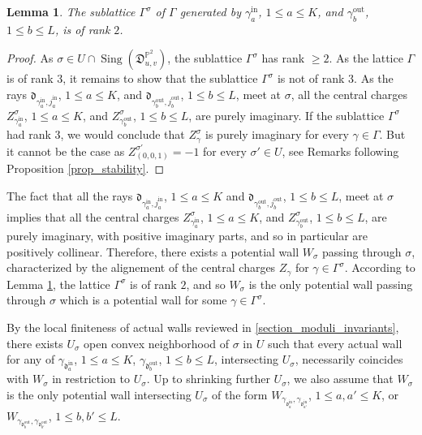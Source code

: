 \documentclass[12pt, a4paper]{amsart}
\newtheorem{lem}[defn]{Lemma}
\newcommand\PP{\mathbb P}
\newcommand\fd{\mathfrak d}
\newcommand\fD{\mathfrak D}
\newcommand\Sing{\operatorname{Sing}}
\newcommand\iin{\mathrm{in}}
\newcommand\oout{\mathrm{out}}
\begin{document}
\begin{lem} \label{lem_rank_two}
The sublattice $\Gamma^\sigma$ of $\Gamma$ generated by $\gamma_a^{\iin}$, $1 \leqslant a \leqslant K$, and $\gamma_b^{\oout}$, $1 \leqslant b \leqslant L$, is of rank $2$.
\end{lem}

\begin{proof}
As $\sigma \in U \cap \Sing (\fD^{\PP^2}_{u,v})$, the sublattice $\Gamma^\sigma$
has rank $\geqslant 2$.
As the lattice $\Gamma$ is of rank $3$, it remains to show that the sublattice 
$\Gamma^\sigma$
is not of rank 3. 
As the rays $\fd_{\gamma_a^{\iin},
j_a^{\iin}}$, $1\leqslant a \leqslant K$,
and $\fd_{\gamma_b^{\oout},
j_b^{\oout} }$, 
$1 \leqslant b \leqslant L$, meet at $\sigma$, all the central charges $Z_{\gamma_a^{\iin}}^\sigma$,
$1 \leqslant a \leqslant K$, and $Z_{\gamma_b^{\oout}}^\sigma$,
$1 \leqslant b \leqslant L$, are purely imaginary. If the sublattice $\Gamma^\sigma$ had rank 3, we would conclude 
that $Z_\gamma^\sigma$ is purely imaginary for every $\gamma \in \Gamma$. 
But it cannot be the case as $Z_{(0,0,1)}^{\sigma'}=-1$ for every $\sigma' \in U$, 
see Remarks following Proposition \ref{prop_stability}.
\end{proof}

The fact that all the rays $\fd_{\gamma_a^{\iin},
j_a^{\iin} }$, $1 \leqslant a \leqslant K$
and $\fd_{\gamma_b^{\oout},
j_b^{\oout} }$, 
$1 \leqslant b \leqslant L$, meet at $\sigma$ implies 
that all the central charges $Z_{\gamma_a^{\iin}}^\sigma$,
$1 \leqslant a \leqslant K$, and $Z_{\gamma_b^{\oout}}^\sigma$,
$1 \leqslant b \leqslant L$, are purely imaginary, with positive imaginary parts, and 
so in particular are positively collinear. 
Therefore, there exists a potential wall $W_\sigma$ passing through $\sigma$, characterized by the alignement of the central charges $Z_\gamma$
for $\gamma \in \Gamma^\sigma$. According to Lemma \ref{lem_rank_two}, 
the lattice $\Gamma^\sigma$ is of rank $2$, and so $W_\sigma$ is the only potential wall passing through $\sigma$ which is a potential wall for some $\gamma \in \Gamma^\sigma$.


By the local finiteness of actual walls
reviewed in \cref{section_moduli_invariants}, there exists $U_\sigma$ open convex neighborhood of $\sigma$ in $U$ such that every actual wall for any of
$\gamma_{\fd_a^{\iin}}$, $1 \leqslant a \leqslant K$,
$\gamma_{\fd_b^{\oout}}$, $1 \leqslant b \leqslant L$, intersecting 
$U_\sigma$, necessarily coincides with 
$W_\sigma$ in restriction to $U_\sigma$. 
Up to shrinking further $U_\sigma$, we also assume that $W_\sigma$
is the only potential wall intersecting $U_\sigma$ of the form 
$W_{\gamma_{\fd_a^{\iin}},\gamma_{\fd_{a'}^{\iin}}}$, 
$1 \leqslant a, a' \leqslant K$, or
$W_{\gamma_{\fd_b^{\oout}},\gamma_{\fd_{b'}^{\oout}}}$, 
$1 \leqslant b, b' \leqslant L$.
\end{document}
